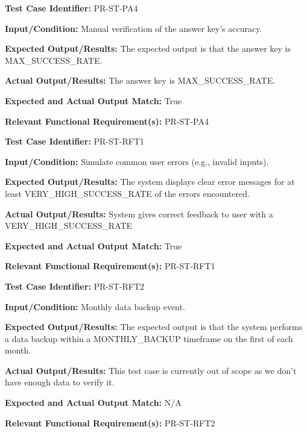 \documentclass[12pt, titlepage]{article}
\begin{document}
\begin{mdframed}[linewidth=0.5mm]
  \textbf{Test Case Identifier:} PR-ST-PA4 \par
  \textbf{Input/Condition:} Manual verification of the answer key’s accuracy. \par
  \textbf{Expected Output/Results:} The expected output is that the answer key is \\MAX\_SUCCESS\_RATE. \par
  \textbf{Actual Output/Results:} The answer key is MAX\_SUCCESS\_RATE.  \par
  \textbf{Expected and Actual Output Match:} True \par
  \textbf{Relevant Functional Requirement(s):} PR-ST-PA4
\end{mdframed}

\begin{mdframed}[linewidth=0.5mm]
  \textbf{Test Case Identifier:} PR-ST-RFT1 \par
  \textbf{Input/Condition:} Simulate common user errors (e.g., invalid inputs). \par
  \textbf{Expected Output/Results:} The system displays clear error messages for at least VERY\_HIGH\_SUCCESS\_RATE of the errors encountered. \par
  \textbf{Actual Output/Results:} System gives correct feedback to user with a \\VERY\_HIGH\_SUCCESS\_RATE \par
  \textbf{Expected and Actual Output Match:} True \par
  \textbf{Relevant Functional Requirement(s):} PR-ST-RFT1
\end{mdframed}

\begin{mdframed}[linewidth=0.5mm]
  \textbf{Test Case Identifier:} PR-ST-RFT2 \par
  \textbf{Input/Condition:} Monthly data backup event. \par
  \textbf{Expected Output/Results:} The expected output is that the system performs a data backup within a MONTHLY\_BACKUP timeframe on the first of each month. \par
  \textbf{Actual Output/Results:} This test case is currently out of scope as we don't have enough data to verify it.\par
  \textbf{Expected and Actual Output Match:} N/A \par
  \textbf{Relevant Functional Requirement(s):} PR-ST-RFT2
\end{mdframed}
\end{document}
